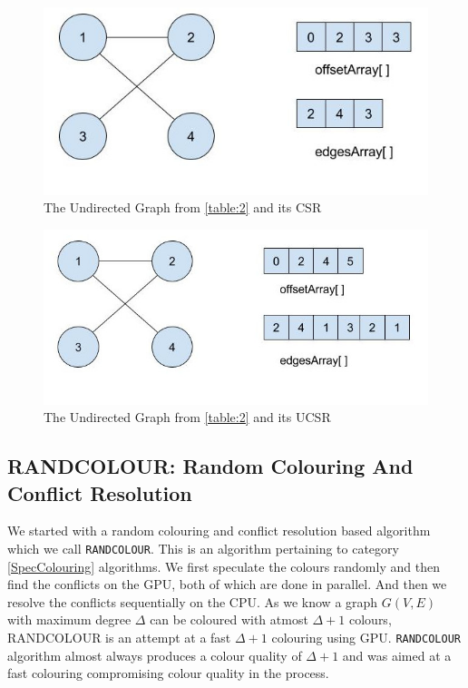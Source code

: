 \documentclass[MTech]{iitmdiss}
\begin{document}
\begin{figure}[h]
    \centering
    \includegraphics[width=\textwidth,scale=0.6,keepaspectratio=true]{csrundirected.jpg}
    \caption{
        The Undirected Graph from \ref{table:2} and its CSR
    }
    \label{fig:csru}
\end{figure}
\begin{figure}[h]
    \centering
    \includegraphics[width=\textwidth,scale=0.6,keepaspectratio=true]{csrundirectednew.jpg}
    \caption{
        The Undirected Graph from \ref{table:2} and its UCSR
    }
    \label{fig:csrun}
\end{figure}
\subsection{RANDCOLOUR: Random Colouring And Conflict Resolution}
We started with a random colouring and conflict resolution based algorithm which we call \verb+RANDCOLOUR+. This is an algorithm pertaining to category \ref{SpecColouring} algorithms. We first speculate the colours randomly and then find the conflicts on the GPU, both of which are done in parallel. And then we resolve the conflicts sequentially on the CPU. As we know a graph $G(V,E)$ with maximum degree $\Delta$ can be coloured with atmost $\Delta+1$ colours, RANDCOLOUR is an attempt at a fast $\Delta+1$ colouring using GPU. \verb+RANDCOLOUR+ algorithm almost always produces a colour quality of $\Delta+1$ and was aimed at a fast colouring compromising colour quality in the process.
\end{document}
